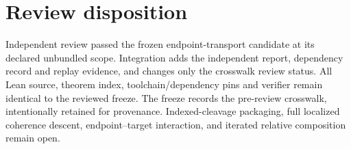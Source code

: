 \documentclass{article}
\begin{document}
\section*{Review disposition}
Independent review passed the frozen endpoint-transport candidate at its declared unbundled scope. Integration adds the independent report, dependency record and replay evidence, and changes only the crosswalk review status. All Lean source, theorem index, toolchain/dependency pins and verifier remain identical to the reviewed freeze. The freeze records the pre-review crosswalk, intentionally retained for provenance. Indexed-cleavage packaging, full localized coherence descent, endpoint--target interaction, and iterated relative composition remain open.
\end{document}
